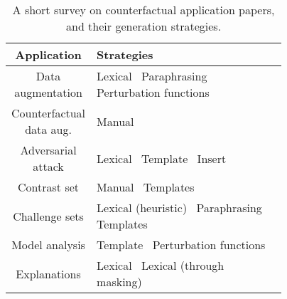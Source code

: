 \begin{table*}[t]
\small
\centering
\setlength{\tabcolsep}{3.5pt}
\begin{tabular}{c p{0.77\linewidth}}
\toprule
\textbf{Application} & \textbf{Strategies} \\ 
\midrule
Data augmentation & 
    Lexical~\cite{Wu2019ConditionalBC, Wei2019EDAED, Kumar2020DataAU}\newline
    Paraphrasing~\cite{iyyer2018adversarial} \newline
    Perturbation functions~\cite{ratner2017snorkel}
\\\midrule
Counterfactual data aug. & 
    Manual~\cite{kaushik2019learning}
\\\midrule
Adversarial attack & 
    Lexical~\cite{alzantot2018generating, garg2020bae, li-etal-2020-bert-attack, morris2020textattack, tan2020s, jin2020bert, ebrahimi2017hotflip, Zhang2019GeneratingFA, Jia2019CertifiedRT} \newline
    Template~\cite{jiang2019avoiding}\newline
    Insert~\cite{Song2020UniversalAA}
\\\midrule
Contrast set & 
    Manual~\cite{gardner2020contrast} \newline
    Templates~\cite{li2020linguistically}
\\\midrule
Challenge sets  & 
    Lexical (heuristic)~\cite{kaushik2019learning, naik2018stress} \newline
    Paraphrasing~\cite{Kavumba2019WhenCP} \newline
    Templates~\cite{Geiger2019PosingFG, kaushik2019learning, nie2019analyzing, mccoy2019right}
\\\midrule
Model analysis & 
    Template~\cite{Goodwin2020ProbingLS}\newline
    Perturbation functions~\cite{wu2019errudite, bowman-etal-2015-large, checklist:acl20}
\\\midrule
Explanations & 
    Lexical~\cite{hase2020evaluating, vig2020causal, kang2020counterfactual} \newline
    Lexical (through masking)~\cite{ramon2019counterfactual, ribeiro2018anchors}
\\
\bottomrule
\end{tabular}
\vspace{-5pt}

\caption{A short survey on counterfactual application papers, and their generation strategies.}
\label{table:perturb_application}
\vspace{-10pt}

\end{table*}

